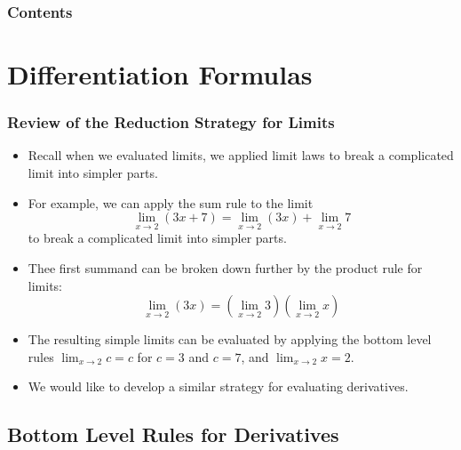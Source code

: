 \documentclass[serif,ignorenonframetext]{beamer}
\title{\commonTitleZeroTwoThree}
\subtitle{\commonSubtitleZeroTwoThree}
\author{\commonAuthor}
\institute{\commonInstitute}
\date{\commonDateZeroTwoThree}
\newcommand{\ds}{\displaystyle}
\begin{document}

\begin{frame}
  \titlepage
\end{frame}

\begin{frame}
  \frametitle{Contents}
  \tableofcontents
\end{frame}

\section{Differentiation Formulas}

\begin{frame}
  \frametitle{Review of the Reduction Strategy for Limits}
  \begin{itemize}[<+->]
  \item Recall when we evaluated limits, we applied limit laws
    to break a complicated limit into simpler parts.
  \item For example, we can apply the sum rule to the limit
    \begin{displaymath}
      \lim_{x\to 2} (3x+7) = \lim_{x\to 2} (3x) + \lim_{x\to 2} 7
    \end{displaymath}
    to break a complicated limit into simpler parts.
  \item Thee first summand can be broken down further by the 
    product rule for limits:
    \begin{displaymath}
      \lim_{x\to 2} (3x) 
      = (\lim_{x\to 2} 3) (\lim_{x\to 2} x )
    \end{displaymath}
  \item The resulting simple limits
    can be evaluated by applying the bottom level rules $\ds\lim_{x\to 2} c
    = c$ for $c=3$ and $c=7$, and $\ds \lim_{x\to 2} x = 2$.
  \item We would like to develop a similar strategy for evaluating derivatives.
  \end{itemize} 
\end{frame}


\subsection{Bottom Level Rules for Derivatives}
\end{document}
